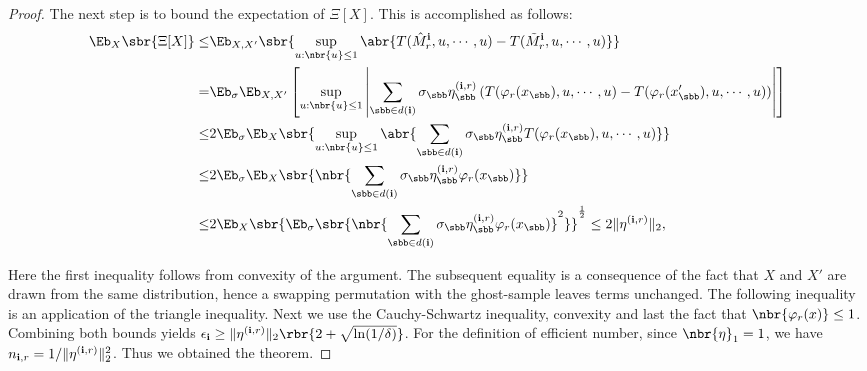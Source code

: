 \documentclass[twoside,11pt]{article}
\newcommand{\ib}{{\bf i}}
\begin{document}
{\begin{proof}
The next step is to bound the expectation of $\Xi[X]$. This is accomplished as follows:
  \begin{align*}
\Eb_{X}\sbr{\Xi[X]} \leq&   \Eb_{X, X'} \sbr{\sup_{u: \nbr{u} \leq 1}
      \abr{ T(\hat{M}_r^{\ib}, u, \cdots, u) -T(\tilde{M}_r^{\ib}, u, 			\cdots, u) }}\\
= &  \Eb_{\sigma} \Eb_{X, X'} \left[\sup_{u: \nbr{u} \leq 1}
      \left| \sum_{\sbb \in d(\ib)} \sigma_\sbb \eta_\sbb^{(\ib,r)} \left( 			T(\varphi_r(x_{\sbb}), u, \cdots, u) \vphantom{ - 							T(\varphi_r(x_{\sbb}'), u, \cdots, u)} - 		 		T(\varphi_r(x_{\sbb}'), u, \cdots, u) \right) \right| \right]\\      
\leq & 2 \Eb_{\sigma} \Eb_{X} \sbr{\sup_{u: \nbr{u} \leq 1}
      \abr{\sum_{\sbb \in d(\ib)} \sigma_\sbb \eta_\sbb^{(\ib,r)} 						T(\varphi_r(x_{\sbb}), u, \cdots, u)}} \\
\leq & 2 \Eb_{\sigma} \Eb_{X} \sbr{\nbr{\sum_{\sbb \in d(\ib)}
        \sigma_\sbb \eta_\sbb^{(\ib,r)} \varphi_r(x_\sbb)}}\\
\leq & 2 \Eb_{X} \sbr{\Eb_{\sigma} \sbr{\nbr{\sum_{\sbb \in d(\ib)} 				\sigma_\sbb \eta_\sbb^{(\ib,r)} \varphi_r(x_\sbb)}^2}}^{\frac{1}{2}} \leq  2\|\eta^{(\ib,r)}\|_2 ,
\end{align*}

Here the first inequality follows from convexity of the argument. The subsequent equality is a consequence of the fact that $X$ and $X'$ are drawn from the same distribution, hence a swapping permutation with the ghost-sample leaves terms unchanged. The following inequality is an application of the triangle inequality. Next we use the Cauchy-Schwartz inequality, convexity and last the fact that $\nbr{\varphi_r(x)} \leq 1$. Combining both bounds yields $\epsilon_\ib \geq  \|\eta^{(\ib,r)}\|_2 \rbr{2+\sqrt{\ln (1/\delta)}}$.
For the definition of efficient number, since $\nbr{\eta}_1 = 1$, we have $n_{\ib,r} = 1/ \|\eta^{(\ib,r)}\|_2^2 $. Thus we obtained the theorem.
\end{proof}

}
\end{document}
